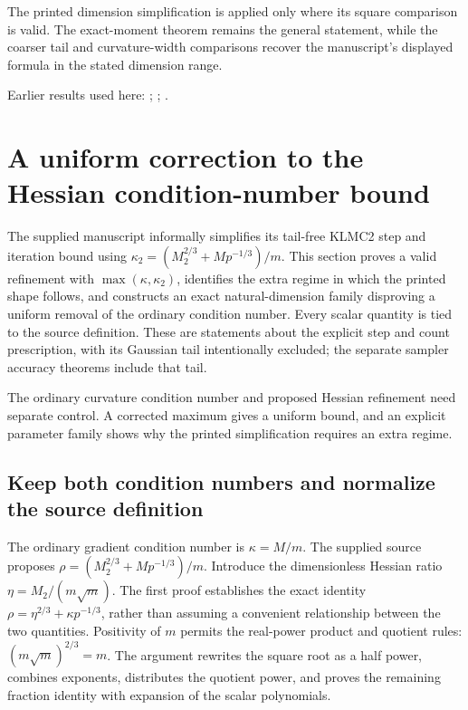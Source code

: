 \documentclass[11pt,a4paper]{report}
\begin{document}
The printed dimension simplification is applied only where its square comparison is valid. The exact-moment theorem remains the general statement, while the coarser tail and curvature-width comparisons recover the manuscript’s displayed formula in the stated dimension range.



Earlier results used here: \cite[Section~3.17.3]{LangevinLean2026ULASC}; \cite[Section~3.17.4]{LangevinLean2026ULASC}; \cite[Section~3.26.3]{LangevinLean2026ULASC}.
\section{\texorpdfstring{A uniform correction to the Hessian condition-number bound}{A uniform correction to the Hessian condition-number bound}}
\label{proof-module-KineticLangevin-ConditionNumber-lean}


The supplied manuscript informally simplifies its tail-free KLMC2 step and iteration bound using \(\kappa_2=(M_2^{2/3}+Mp^{-1/3})/m\). This section proves a valid refinement with \(\max(\kappa,\kappa_2)\), identifies the extra regime in which the printed shape follows, and constructs an exact natural-dimension family disproving a uniform removal of the ordinary condition number. Every scalar quantity is tied to the source definition. These are statements about the explicit step and count prescription, with its Gaussian tail intentionally excluded; the separate sampler accuracy theorems include that tail.



The ordinary curvature condition number and proposed Hessian refinement need separate control. A corrected maximum gives a uniform bound, and an explicit parameter family shows why the printed simplification requires an extra regime.

\subsection{\texorpdfstring{Keep both condition numbers and normalize the source definition}{Keep both condition numbers and normalize the source definition}}
\label{report-step-KineticLangevin-ConditionNumber-lean-1}


The ordinary gradient condition number is \(\kappa=M/m\). The supplied source proposes \(\rho=(M_2^{2/3}+Mp^{-1/3})/m\). Introduce the dimensionless Hessian ratio \(\eta=M_2/(m\sqrt m)\). The first proof establishes the exact identity \(\rho=\eta^{2/3}+\kappa p^{-1/3}\), rather than assuming a convenient relationship between the two quantities. Positivity of \(m\) permits the real-power product and quotient rules: \((m\sqrt m)^{2/3}=m\). The argument rewrites the square root as a half power, combines exponents, distributes the quotient power, and proves the remaining fraction identity with expansion of the scalar polynomials.
\end{document}

